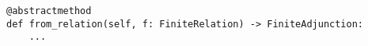 \begin{verbatim}
@abstractmethod
def from_relation(self, f: FiniteRelation) -> FiniteAdjunction:
    ...
\end{verbatim}